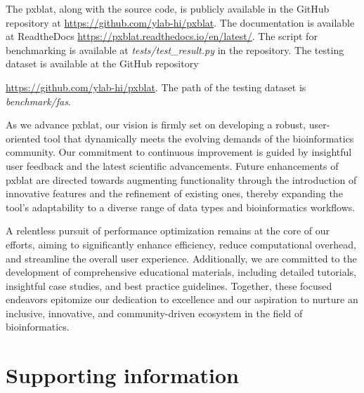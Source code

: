 \documentclass[10pt,letterpaper]{article}
\begin{document}
The \gls{pxblat}, along with the source code, is publicly available in the GitHub repository at \url{https://github.com/ylab-hi/pxblat}.
The documentation is available at ReadtheDocs \url{https://pxblat.readthedocs.io/en/latest/}.
The script for benchmarking is available at \emph{tests/test\_result.py} in the repository.
The testing dataset is available at the GitHub repository {\url{https://github.com/ylab-hi/pxblat}.
The path of the testing dataset is \emph{benchmark/fas}.

As we advance \gls{pxblat}, our vision is firmly set on developing a robust, user-oriented tool that dynamically meets the evolving demands of the bioinformatics community.
Our commitment to continuous improvement is guided by insightful user feedback and the latest scientific advancements.
Future enhancements of \gls{pxblat} are directed towards augmenting functionality through the introduction of innovative features and the refinement of existing ones, thereby expanding the tool's adaptability to a diverse range of data types and bioinformatics workflows.

A relentless pursuit of performance optimization remains at the core of our efforts, aiming to significantly enhance efficiency, reduce computational overhead, and streamline the overall user experience.
Additionally, we are committed to the development of comprehensive educational materials, including detailed tutorials, insightful case studies, and best practice guidelines.
Together, these focused endeavors epitomize our dedication to excellence and our aspiration to nurture an inclusive, innovative, and community-driven ecosystem in the field of bioinformatics.



\section*{Supporting information}

}
\end{document}
